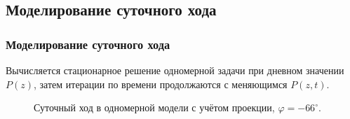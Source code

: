 \documentclass[9pt, apectratio=43,unicode]{beamer}
\begin{document}
\subsection{Моделирование суточного хода}
\begin{frame}\frametitle{Моделирование суточного хода}

Вычисляется стационарное решение одномерной задачи при дневном значении $P(z)$, затем итерации по времени продолжаются с меняющимся $P(z, t)$.

\begin{figure}[H]
\caption{Суточный ход в одномерной модели с учётом проекции, $\varphi = -66^\circ$.}
\end{figure}

\end{frame}
\end{document}
